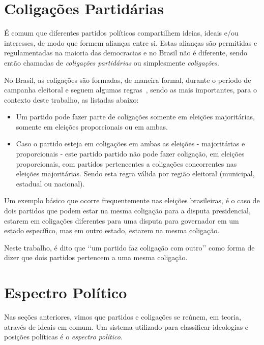 
\section{Coligações Partidárias}
\label{conceitos__coligacoes}

É comum que diferentes partidos políticos compartilhem ideias, ideais e/ou interesses, de modo que formem alianças entre si. Estas alianças são permitidas e regulamentadas na maioria das democracias e no Brasil não é diferente, sendo então chamadas de \emph{coligações partidárias} ou simplesmente \emph{coligações}.

No Brasil, as coligações são formadas, de maneira formal, durante o período de campanha eleitoral e seguem algumas regras~\cite{brasil1997lei9504}, sendo as mais importantes, para o contexto deste trabalho, as listadas abaixo:

\begin{itemize}
    \item Um partido pode fazer parte de coligações somente em eleições majoritárias, somente em eleições proporcionais ou em ambas.
    \item Caso o partido esteja em coligações em ambas as eleições - majoritárias e proporcionais - este partido partido não pode fazer coligação, em eleições proporcionais, com partidos pertencentes a coligações concorrentes nas eleições majoritárias. Sendo esta regra válida por região eleitoral (municipal, estadual ou nacional).
\end{itemize}

Um exemplo básico que ocorre frequentemente nas eleições brasileiras, é o caso de dois partidos que podem estar na mesma coligação para a disputa presidencial, estarem em coligações diferentes para uma disputa para governador em um estado específico, mas em outro estado, estarem na mesma coligação.

Neste trabalho, é dito que ‘‘um partido faz coligação com outro’’ como forma de dizer que dois partidos pertencem a uma mesma coligação.


\section{Espectro Político}
\label{conceitos__espectro-politico}

Nas seções anteriores, vimos que partidos e coligações se reúnem, em teoria, através de ideais em comum. Um sistema utilizado para classificar ideologias e posições políticas é o \emph{espectro político}.

